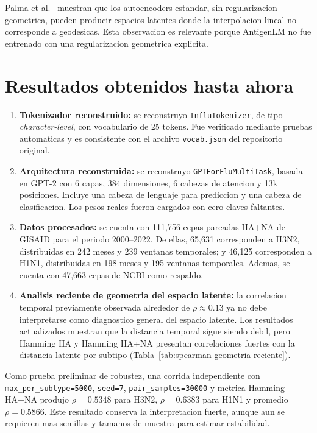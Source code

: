 \documentclass[12pt,letterpaper]{article}
\begin{document}
Palma et al.~\cite{palma2025flatvi} muestran que los autoencoders estandar, sin regularizacion geometrica, pueden producir espacios latentes donde la interpolacion lineal no corresponde a geodesicas. Esta observacion es relevante porque AntigenLM no fue entrenado con una regularizacion geometrica explicita.

\section{Resultados obtenidos hasta ahora}

\begin{enumerate}[label=\textbf{\arabic*.}, leftmargin=2.2em]
    \item \textbf{Tokenizador reconstruido:} se reconstruyo \texttt{InfluTokenizer}, de tipo \emph{character-level}, con vocabulario de 25 tokens. Fue verificado mediante pruebas automaticas y es consistente con el archivo \texttt{vocab.json} del repositorio original.

    \item \textbf{Arquitectura reconstruida:} se reconstruyo \texttt{GPTForFluMultiTask}, basada en GPT-2 con 6 capas, 384 dimensiones, 6 cabezas de atencion y 13k posiciones. Incluye una cabeza de lenguaje para prediccion y una cabeza de clasificacion. Los pesos reales fueron cargados con cero claves faltantes.

    \item \textbf{Datos procesados:} se cuenta con 111,756 cepas pareadas HA+NA de GISAID para el periodo 2000--2022. De ellas, 65,631 corresponden a H3N2, distribuidas en 242 meses y 239 ventanas temporales; y 46,125 corresponden a H1N1, distribuidas en 198 meses y 195 ventanas temporales. Ademas, se cuenta con 47,663 cepas de NCBI como respaldo.

    \item \textbf{Analisis reciente de geometria del espacio latente:} la correlacion temporal previamente observada alrededor de $\rho \approx 0.13$ ya no debe interpretarse como diagnostico general del espacio latente. Los resultados actualizados muestran que la distancia temporal sigue siendo debil, pero Hamming HA y Hamming HA+NA presentan correlaciones fuertes con la distancia latente por subtipo (Tabla~\ref{tab:spearman-geometria-reciente}).
\end{enumerate}

Como prueba preliminar de robustez, una corrida independiente con \texttt{max\_per\_subtype=5000}, \texttt{seed=7}, \texttt{pair\_samples=30000} y metrica Hamming HA+NA produjo $\rho=0.5348$ para H3N2, $\rho=0.6383$ para H1N1 y promedio $\rho=0.5866$. Este resultado conserva la interpretacion fuerte, aunque aun se requieren mas semillas y tamanos de muestra para estimar estabilidad.
\end{document}
